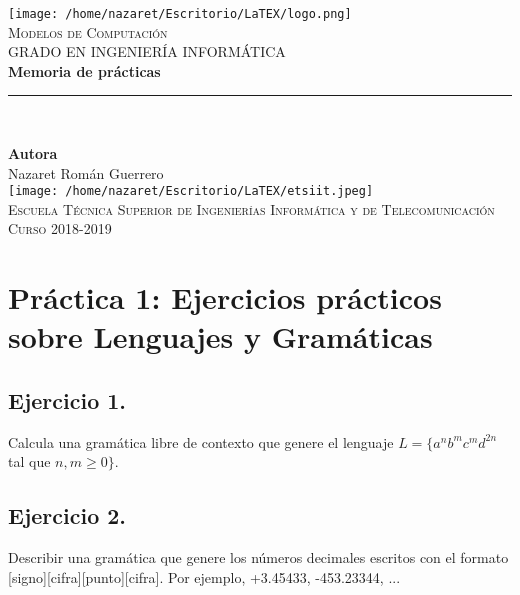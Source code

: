 \documentclass[11pt,a4paper]{article}
\begin{document}
\begin{titlepage}

\begin{minipage}{\textwidth}

\centering
\texttt{[image: /home/nazaret/Escritorio/LaTEX/logo.png]}\\

\textsc{\Large Modelos de Computación\\[0.2cm]}
\textsc{GRADO EN INGENIERÍA INFORMÁTICA}\\[1cm]

{\Huge\bfseries Memoria de prácticas\\}
\noindent\rule[-1ex]{\textwidth}{3pt}\\[3.5ex]
{\large\bfseries}
\end{minipage}

\vspace{1.5cm}
\begin{minipage}{\textwidth}
\centering

\textbf{Autora}\\ {Nazaret Román Guerrero}\\[2.5ex]
\texttt{[image: /home/nazaret/Escritorio/LaTEX/etsiit.jpeg]}\\[0.1cm]
\vspace{1cm}
\textsc{Escuela Técnica Superior de Ingenierías Informática y de Telecomunicación}\\
\vspace{1cm}
\textsc{Curso 2018-2019}
\end{minipage}
\end{titlepage}

\tableofcontents
\thispagestyle{empty}

\newpage

\section{Práctica 1: Ejercicios prácticos sobre Lenguajes y Gramáticas}
\subsection{Ejercicio 1.} Calcula una gramática libre de contexto que genere el lenguaje $L=\{a^nb^mc^md^{2n}$ tal que $n,m\geq 0\}$.

\subsection{Ejercicio 2.} Describir una gramática que genere los números decimales escritos con el formato [signo][cifra][punto][cifra]. Por ejemplo, +3.45433, -453.23344, ...
\end{document}
